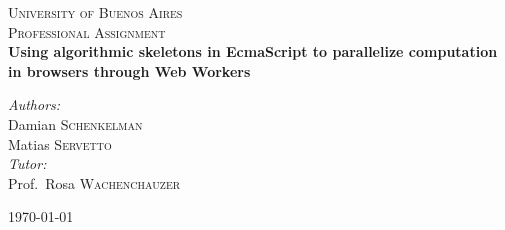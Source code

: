 \begin{titlepage}
\begin{center}

\textsc{\LARGE University of Buenos Aires}\\[1.5cm]

\textsc{\Large Professional Assignment}\\[0.5cm]

{ \huge \bfseries Using algorithmic skeletons in EcmaScript to parallelize computation in browsers through Web Workers \\[0.4cm] }

\noindent

\emph{Authors:}\\
Damian \textsc{Schenkelman}\\
Matias \textsc{Servetto}\\[0.5cm]

\emph{Tutor:}\\
Prof.~Rosa \textsc{Wachenchauzer}

\vfill

{\large \today}

\end{center}
\end{titlepage}